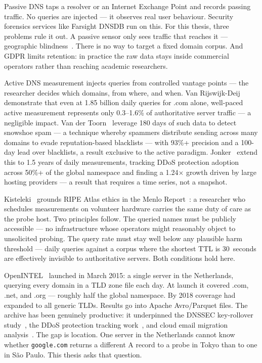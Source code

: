 Passive \ac{DNS} taps a resolver or an Internet Exchange Point and records passing traffic. No queries are injected — it observes real user behaviour. Security forensics services like Farsight DNSDB run on this. For this thesis, three problems rule it out. A passive sensor only sees traffic that reaches it — geographic blindness~\cite{vanRijswijk2016}. There is no way to target a fixed domain corpus. And GDPR limits retention: in practice the raw data stays inside commercial operators rather than reaching academic researchers.

Active \ac{DNS} measurement injects queries from controlled vantage points — the researcher decides which domains, from where, and when. Van Rijswijk-Deij~\cite{vanRijswijk2016} demonstrate that even at 1.85 billion daily queries for .com alone, well-paced active measurement represents only 0.3–1.6\% of authoritative server traffic — a negligible impact. Van der Toorn~\cite{vanderToorn2018} leverage 180 days of such data to detect snowshoe spam — a technique whereby spammers distribute sending across many domains to evade reputation-based blacklists — with 93\%+ precision and a 100-day lead over blacklists, a result exclusive to the active paradigm. Jonker~\cite{Jonker2016} extend this to 1.5 years of daily measurements, tracking \ac{DDoS} protection adoption across 50\%+ of the global namespace and finding a 1.24$\times$ growth driven by large hosting providers — a result that requires a time series, not a snapshot.

Kisteleki~\cite{Kisteleki2016} grounds RIPE Atlas ethics in the Menlo Report~\cite{Bailey2012}: a researcher who schedules measurements on volunteer hardware carries the same duty of care as the probe host. Two principles follow. The queried names must be publicly accessible --- no infrastructure whose operators might reasonably object to unsolicited probing. The query rate must stay well below any plausible harm threshold --- daily queries against a corpus where the shortest \ac{TTL} is 30~seconds are effectively invisible to authoritative servers. Both conditions hold here.

OpenINTEL~\cite{vanRijswijk2016} launched in March 2015: a single server in the Netherlands, querying every domain in a \ac{TLD} zone file each day. At launch it covered .com, .net, and .org — roughly half the global namespace. By 2018 coverage had expanded to all generic \ac{TLD}s. Results go into Apache Avro/Parquet files. The archive has been genuinely productive: it underpinned the \ac{DNSSEC} key-rollover study~\cite{Chung2017}, the \ac{DDoS} protection tracking work~\cite{Jonker2016}, and cloud email migration analysis~\cite{vanRijswijk2018blog}. The gap is location. One server in the Netherlands cannot know whether \texttt{google.com} returns a different \ac{A} record to a probe in Tokyo than to one in São Paulo. This thesis asks that question.


